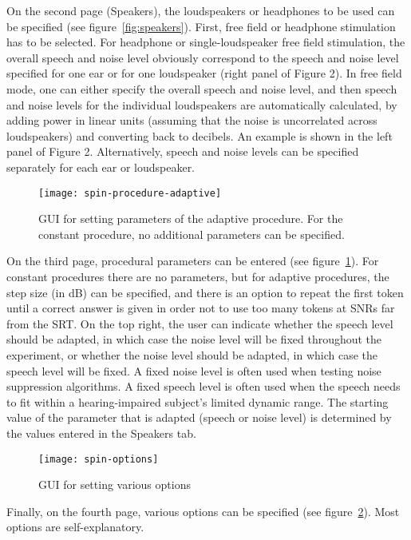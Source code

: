 On the second page (Speakers), the loudspeakers or headphones to be used
can be specified (see figure~\ref{fig:speakers}). First, free
field or headphone stimulation has to be selected. For headphone or
single-loudspeaker free field stimulation, the overall speech and noise
level obviously correspond to the speech and noise level specified for
one ear or for one loudspeaker (right panel of Figure 2). In free field mode, one can either
specify the overall speech and noise level, and then speech and noise
levels for the individual loudspeakers are automatically calculated, by
adding power in linear units (assuming that the noise is uncorrelated
across loudspeakers) and converting back to decibels. An example is shown in the left panel of Figure 2. Alternatively,
speech and noise levels can be specified separately for each ear or
loudspeaker. 

 \begin{figure} 
\texttt{[image: spin-procedure-adaptive]}
\caption{GUI for setting parameters of the adaptive procedure. For the constant procedure, no additional parameters can be specified. }
\label{fig:procedure} \end{figure} 

On the third page, procedural parameters can be entered (see
figure~\ref{fig:procedure}). For constant procedures there are no
parameters, but for adaptive procedures, the step size (in dB) can be
specified, and there is an option to repeat the first token until a
correct answer is given in order not to use too many tokens at SNRs far from
the SRT. On the top right, the user can indicate whether the speech
level should be adapted, in which case the noise level will be fixed
throughout the experiment, or whether the noise level should be adapted,
in which case the speech level will be fixed. A fixed noise level is
often used when testing noise suppression algorithms. A fixed speech
level is often used when the speech needs to fit within a
hearing-impaired subject's limited dynamic range. The starting value of
the parameter that is adapted (speech or noise level) is determined by
the values entered in the Speakers tab.

 \begin{figure} 
\texttt{[image: spin-options]}
\caption{GUI for setting various options} \label{fig:options}
\end{figure} 

Finally, on the fourth page, various options can be specified (see
figure~\ref{fig:options}). Most options are self-explanatory.

